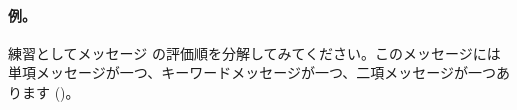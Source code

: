 \documentclass[a4paper,10pt,twoside]{book}
\begin{document}




\paragraph{例。} 練習としてメッセージ  の評価順を分解してみてください。このメッセージには単項メッセージが一つ、キーワードメッセージが一つ、二項メッセージが一つあります ()。

\end{document}
